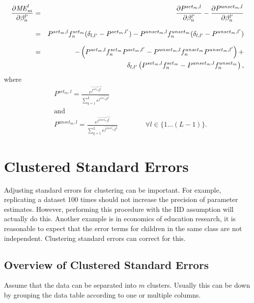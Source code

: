 \begin{eqnarray*}
  \pder[\mathit{ME}_m^l]{\beta_n^{l'}} &=&
        \pder[P^{set_m, l}]{\beta_n^{l'}} - \pder[P^{unset_m, l}]{\beta_n^{l'}} \\[7pt]
        &=& P^{set_m, l} f_n^{set_m} (\delta_{l,l'} - P^{set_m, l'}) -
            P^{unset_m, l} f_n^{unset_m} (\delta_{l,l'} - P^{unset_m, l'}) \\[7pt]
        &=&  - \left(P^{set_m, l} f_n^{set_m} P^{set_m, l'} -
                             P^{unset_m, l} f_n^{unset_m} P^{unset_m, l'} \right) + \\
        && \qquad \delta_{l,l'} \left(P^{set_m, l} f_n^{set_m} - P^{unset_m, l} f_n^{unset_m} \right),
\end{eqnarray*}
where
\begin{align*}
  & P^{set_m, l} = \frac{e^{\vec{f^{set_m}}\vec{\beta^l}}}{\displaystyle \sum_{q=1}^{L} e^{\vec{f^{set_m}}\vec{\beta^q}}} \\
   & \text{and} \\
   & P^{unset_m, l} = \frac{e^{\vec{f^{unset_m}}\vec{\beta^l}}}{\displaystyle \sum_{q=1}^{L} e^{\vec{f^{unset_m}}\vec{\beta^q}}} \qquad \qquad \forall l \in \{ 1 \ldots (L-1) \}.
\end{align*}





\section{Clustered Standard Errors} %
\label{sec:clustered_standard_errors}
Adjusting standard errors for clustering can be important. For
example, replicating a dataset 100 times should not increase the
precision of parameter estimates. However, performing this procedure
with the IID assumption will actually do this. Another example is in
economics of education research, it is reasonable to expect that the
error terms for children in the same class are not
independent. Clustering standard errors can correct for this.

\subsection{Overview of Clustered Standard Errors}

Assume that the data can be separated into $m$ clusters. Usually this
can be down by grouping the data table according to one or multiple
columns.

